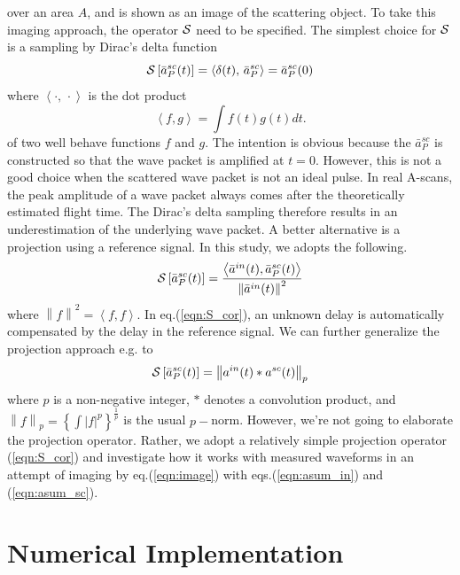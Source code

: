 ﻿\documentclass[11pt,a4j]{article}
\begin{document}
over an area $A$, and is shown as an image of the scattering object.
To take this imaging approach, the operator $\cal S$ need to be specified. 
 The simplest choice for $\cal S$ is a sampling by Dirac's delta function 
\begin{equation}
	{\cal S} \left[ 
		\bar{a}^{sc}_P(t) 
		\right]
	=\left<
	\delta(t),\, \bar{a}^{sc}_P
	\right>
	=
	\bar{a}^{sc}_P(0)
\end{equation}
where $\left<\cdot,\, \cdot \right>$ is the dot product
\begin{equation}
	\left< f,g \right>=\int f(t)g(t) dt.
	\label{eqn:}
\end{equation}
of two well behave functions $f$ and $g$.
The intention is obvious because the $\bar{a}^{sc}_P$ is constructed so that the 
wave packet is amplified at $t=0$. However, this is not a good choice when the scattered 
wave packet is not an ideal pulse. In real A-scans, the peak amplitude of a  
wave packet always comes after the theoretically estimated flight time. 
The Dirac's delta sampling therefore results in an underestimation of the underlying wave packet. 
A better alternative is a projection using a reference signal. 
In this study, we adopts the following. 
\begin{equation}
	{\cal S} \left[ 
		\bar{a}^{sc}_P(t) 
		\right]
	=
	\frac{
		\left< 
			\bar{a}^{in}(t) 
			,\bar{a}^{sc}_P(t) 
		\right>
	}{
		\left\| 
			\bar{a}^{in}(t) 
		\right\|^2
	}
	\label{eqn:S_cor}
\end{equation}
where $\left\| f \right\|^2 =\left< f,f \right>$. 
In eq.(\ref{eqn:S_cor}), an unknown delay is automatically compensated by the 
delay in the reference signal.  
We can further generalize the projection approach e.g. to 
\begin{equation}
	{\cal S} \left[ 
		\bar{a}^{sc}_P(t) 
		\right]
	=
	\left\|a^{in}(t)*a^{sc}(t)\right\|_p
	\label{eqn:}
\end{equation}
where $p$ is a non-negative integer, $*$ denotes a convolution product, 
and $\left\| f  \right\|_p= \left\{\int \left| f\right|^p\right\}^{\frac{1}{p}}$ 
is the usual $p-$norm. However, we're not going to elaborate the projection operator. 
Rather, we adopt a relatively simple projection operator (\ref{eqn:S_cor}) and 
 investigate how it works with measured waveforms in an attempt of 
 imaging by eq.(\ref{eqn:image}) with eqs.(\ref{eqn:asum_in}) and (\ref{eqn:asum_sc}).
\section{Numerical Implementation}
\end{document}
